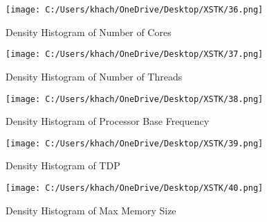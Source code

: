 \documentclass[a4paper]{article}
\begin{document}
	\begin{figure}[htbp]
		\centering
		\begin{minipage}[t]{0.45\textwidth}
			\centering
			\begin{adjustbox}{width=\textwidth, frame}
				\texttt{[image: C:/Users/khach/OneDrive/Desktop/XSTK/36.png]}
			\end{adjustbox}
			\captionsetup{justification=centering}
			\vspace{0.5cm}
			\caption{Density Histogram of Number of Cores}
		\end{minipage}\hfill
		\begin{minipage}[t]{0.45\textwidth}
			\centering
			\begin{adjustbox}{width=\textwidth, frame}
				\texttt{[image: C:/Users/khach/OneDrive/Desktop/XSTK/37.png]}
			\end{adjustbox}
			\captionsetup{justification=centering}
			\vspace{0.5cm}
			\caption{Density Histogram of Number of Threads}
		\end{minipage}
	\end{figure}
	\begin{figure}[htbp]
		\centering
		\begin{minipage}[t]{0.45\textwidth}
			\centering
			\begin{adjustbox}{width=\textwidth, frame}
				\texttt{[image: C:/Users/khach/OneDrive/Desktop/XSTK/38.png]}
			\end{adjustbox}
			\captionsetup{justification=centering}
			\vspace{0.5cm}
			\caption{Density Histogram of Processor Base Frequency}
		\end{minipage}\hfill
		\begin{minipage}[t]{0.45\textwidth}
			\centering
			\begin{adjustbox}{width=\textwidth, frame}
				\texttt{[image: C:/Users/khach/OneDrive/Desktop/XSTK/39.png]}
			\end{adjustbox}
			\captionsetup{justification=centering}
			\vspace{0.5cm}
			\caption{Density Histogram of TDP}
		\end{minipage}
	\end{figure}
	\begin{figure}[htbp]
		\centering
		\begin{adjustbox}{width=0.7\textwidth, frame}
			\texttt{[image: C:/Users/khach/OneDrive/Desktop/XSTK/40.png]}
		\end{adjustbox}
		\captionsetup{justification=centering}
		\vspace{0.5cm}
		\caption{Density Histogram of Max Memory Size}
	\end{figure}
	\newpage
\end{document}
